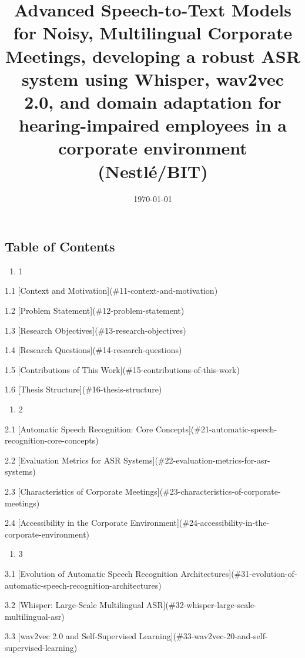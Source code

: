 \documentclass[12pt,a4paper]{article}
\title{Advanced Speech-to-Text Models for Noisy, Multilingual Corporate Meetings, developing a robust ASR system using Whisper, wav2vec 2.0, and domain adaptation for hearing-impaired employees in a corporate environment (Nestlé/BIT)}
\author{}
\date{\today}
\begin{document}
\maketitle
\tableofcontents
\newpage

\subsection{Table of Contents}


\begin{enumerate}
  \item 1
\end{enumerate}

1.1 [Context and Motivation](\#11-context-and-motivation)

1.2 [Problem Statement](\#12-problem-statement)

1.3 [Research Objectives](\#13-research-objectives)

1.4 [Research Questions](\#14-research-questions)

1.5 [Contributions of This Work](\#15-contributions-of-this-work)

1.6 [Thesis Structure](\#16-thesis-structure)

\begin{enumerate}
  \item 2
\end{enumerate}

2.1 [Automatic Speech Recognition: Core Concepts](\#21-automatic-speech-recognition-core-concepts)

2.2 [Evaluation Metrics for ASR Systems](\#22-evaluation-metrics-for-asr-systems)

2.3 [Characteristics of Corporate Meetings](\#23-characteristics-of-corporate-meetings)

2.4 [Accessibility in the Corporate Environment](\#24-accessibility-in-the-corporate-environment)

\begin{enumerate}
  \item 3
\end{enumerate}

3.1 [Evolution of Automatic Speech Recognition Architectures](\#31-evolution-of-automatic-speech-recognition-architectures)

3.2 [Whisper: Large-Scale Multilingual ASR](\#32-whisper-large-scale-multilingual-asr)

3.3 [wav2vec 2.0 and Self-Supervised Learning](\#33-wav2vec-20-and-self-supervised-learning)
\end{document}
